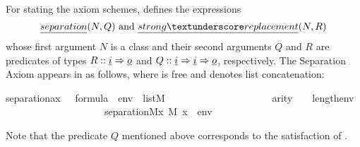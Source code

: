 For stating the axiom schemes,  defines
the expressions
\[
  \isa{separation}(N,Q)
  \text{ and }
  \isa{strong{\uscore}replacement}(N,R)
\]
whose first argument $N$ is a class and their second arguments $Q$ and
$R$ are predicates of types $R :: \tyi \fun \tyo$ and $Q ::
\tyi \fun \tyi \fun \tyo$, respectively. The Separation Axiom appears in
 as follows, where 
\isa{\isasymphi} is free and \isa{\isacharat} denotes
list concatenation:
\begin{isabelle}
separation{\isacharunderscore}{\kern0pt}ax{\isacharcolon}{\kern0pt}\ {\isachardoublequoteopen}{\isasymphi}\ {\isasymin}\ formula\ {\isasymLongrightarrow}\ env\ {\isasymin}\ list{\isacharparenleft}{\kern0pt}M{\isacharparenright}{\kern0pt}\ {\isasymLongrightarrow}\isanewline
\ \ \ \ \ \ \ \ \ \ \ \ \ \ \ \ \ \ \ \ arity{\isacharparenleft}{\kern0pt}{\isasymphi}{\isacharparenright}{\kern0pt}\ {\isasymle}\ {}\ {\isacharplus}{\kern0pt}\isactrlsub {\isasymomega}\ length{\isacharparenleft}{\kern0pt}env{\isacharparenright}{\kern0pt}\ {\isasymLongrightarrow}\isanewline
\ \ \ \ \ \ \ \ \ \ \ \ \ \ \ \ \ \ \ \ separation{\isacharparenleft}{\kern0pt}{\isacharhash}{\kern0pt}{\isacharhash}{\kern0pt}M{\isacharcomma}{\kern0pt}{\isasymlambda}x{\isachardot}{\kern0pt}\ {\isacharparenleft}{\kern0pt}M{\isacharcomma}{\kern0pt}\ {\isacharbrackleft}{\kern0pt}x{\isacharbrackright}{\kern0pt}\ {\isacharat}{\kern0pt}\ env\ {\isasymTurnstile}\ {\isasymphi}{\isacharparenright}{\kern0pt}{\isacharparenright}{\kern0pt}{\isachardoublequoteclose}
\end{isabelle}
Note that the predicate $Q$ mentioned above corresponds to the
satisfaction of \isa{\isasymphi}.


